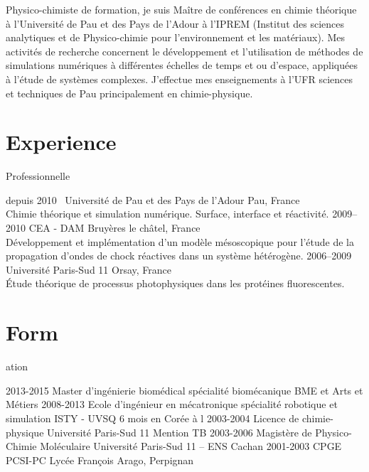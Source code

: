\documentclass{cv-style}     %
\begin{document}
Physico-chimiste de formation, je suis Maître de conférences en chimie théorique
 à l'Université de Pau et des Pays de l'Adour à l'IPREM (Institut des sciences
 analytiques et de Physico-chimie pour l'environnement et les matériaux). Mes activités de
recherche concernent le développement et l'utilisation de méthodes de simulations
numériques à
différentes échelles de temps et ou d'espace, appliquées
à l'étude de systèmes complexes. J'effectue mes enseignements à l'UFR sciences et
techniques de Pau principalement en chimie-physique.

\section{Experience}{ Professionnelle}

\begin{entrylist}
\entry
  {depuis 2010~}
  {Université de Pau et des Pays de l'Adour}
  {Pau, France}
  {\\
   Chimie théorique et simulation numérique.
   Surface, interface et réactivité.}
\entry
  {2009--2010}
  {CEA - DAM}
  {Bruyères le châtel, France}
  {
  \\
  Développement et implémentation d'un modèle mésoscopique pour l'étude de la propagation
  d'ondes de chock réactives dans un système hétérogène.
  }
\entry
  {2006--2009}
  {Université Paris-Sud 11}
  {Orsay, France}
  {
  \\
  Étude théorique de processus photophysiques dans les protéines fluorescentes.
  }
\end{entrylist}


\section{Form}{ation}

\begin{entrylist}
\entry
{2013-2015}
{Master d'ingénierie biomédical {\normalfont spécialité biomécanique}}
{BME et Arts et Métiers}
{}
\entry
{2008-2013}
{Ecole d'ingénieur en mécatronique {\normalfont spécialité robotique et simulation}}
{ISTY - UVSQ}
{6 mois en Corée à l}
\entry
{2003-2004}
{Licence de chimie-physique}
{Université Paris-Sud 11}
{Mention TB}
\entry
{2003-2006}
{Magistère de Physico-Chimie Moléculaire}
{Université Paris-Sud 11 -- ENS Cachan}
{}
\entry
{2001-2003}
{CPGE {\normalfont PCSI-PC}}
{Lycée François Arago, Perpignan}
{}
\end{entrylist}
\end{document}
